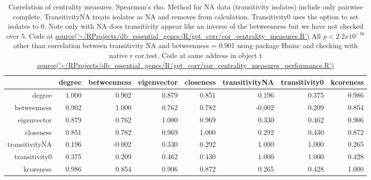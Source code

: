 \begin{table}[ht]
\centering
\begin{adjustbox}{width=\textwidth}
\begin{tabular}{rrrrrrrr}
  \toprule
 & degree & betweenness & eigenvector & closeness & transitivityNA & transitivity0 & kcoreness \\ 
  \midrule
degree & 1.000 & 0.902 & 0.879 & 0.851 & 0.196 & 0.375 & 0.986 \\ 
  betweenness & 0.902 & 1.000 & 0.762 & 0.782 & -0.002 & 0.209 & 0.854 \\ 
  eigenvector & 0.879 & 0.762 & 1.000 & 0.969 & 0.330 & 0.462 & 0.906 \\ 
  closeness & 0.851 & 0.782 & 0.969 & 1.000 & 0.292 & 0.430 & 0.872 \\ 
  transitivityNA & 0.196 & -0.002 & 0.330 & 0.292 & 1.000 & 1.000 & 0.265 \\ 
  transitivity0 & 0.375 & 0.209 & 0.462 & 0.430 & 1.000 & 1.000 & 0.428 \\ 
  kcoreness & 0.986 & 0.854 & 0.906 & 0.872 & 0.265 & 0.428 & 1.000 \\ 
   \bottomrule
 
   
\end{tabular}
\end{adjustbox}
\caption[Correlation of centrality measures]{Correlation of centrality measures. Spearman's rho. Method for NA data (transitivity isolates) include only pairwise complete. TransitivityNA treats isolates as NA and removes from calculation. Transitivity0 uses the option to set isolates to 0. Note only with NA does transitivity appear like an inverse of the betweenness but we have not checked over 5. Code at \url{source('~/RProjects/db_essential_genes/R/get_corr/cor_centrality_measures.R')} All $p<2.2 x 10^{-16}$ other than correlation between transitivity NA and betweenness = 0.901 using package Hmisc and checking with native r cor.test. Code at same address in object t \url{source('~/RProjects/db_essential_genes/R/get_corr/cor_centrality_measures_performance.R')}} 
\label{tab:Correlation of centrality measures 2 transitvities}
\end{table}

